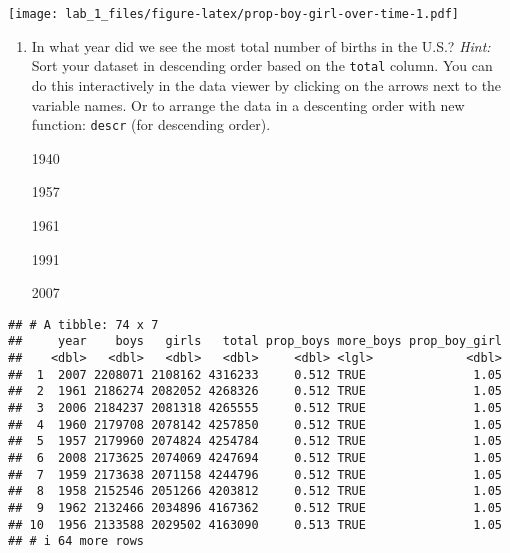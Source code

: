 \documentclass[
]{article}
\newenvironment{Shaded}{\begin{snugshade}}{\end{snugshade}}
\newcommand{\AttributeTok}[1]{\textcolor[rgb]{0.13,0.29,0.53}{#1}}
\newcommand{\CommentTok}[1]{\textcolor[rgb]{0.56,0.35,0.01}{\textit{#1}}}
\newcommand{\FunctionTok}[1]{\textcolor[rgb]{0.13,0.29,0.53}{\textbf{#1}}}
\newcommand{\NormalTok}[1]{#1}
\newcommand{\SpecialCharTok}[1]{\textcolor[rgb]{0.81,0.36,0.00}{\textbf{#1}}}
\providecommand{\tightlist}{%
  \setlength{\itemsep}{0pt}\setlength{\parskip}{0pt}}
\begin{document}
\texttt{[image: lab\_1\_files/figure-latex/prop-boy-girl-over-time-1.pdf]}

\begin{enumerate}
\def\labelenumi{\arabic{enumi}.}
\setcounter{enumi}{7}
\tightlist
\item
  In what year did we see the most total number of births in the U.S.?
  \emph{Hint:} Sort your dataset in descending order based on the
  \texttt{total} column. You can do this interactively in the data
  viewer by clicking on the arrows next to the variable names. Or to
  arrange the data in a descenting order with new function:
  \texttt{descr} (for descending order).

  1940

  1957

  1961

  1991

  2007
\end{enumerate}

\begin{Shaded}
\end{Shaded}

\begin{verbatim}
## # A tibble: 74 x 7
##     year    boys   girls   total prop_boys more_boys prop_boy_girl
##    <dbl>   <dbl>   <dbl>   <dbl>     <dbl> <lgl>             <dbl>
##  1  2007 2208071 2108162 4316233     0.512 TRUE               1.05
##  2  1961 2186274 2082052 4268326     0.512 TRUE               1.05
##  3  2006 2184237 2081318 4265555     0.512 TRUE               1.05
##  4  1960 2179708 2078142 4257850     0.512 TRUE               1.05
##  5  1957 2179960 2074824 4254784     0.512 TRUE               1.05
##  6  2008 2173625 2074069 4247694     0.512 TRUE               1.05
##  7  1959 2173638 2071158 4244796     0.512 TRUE               1.05
##  8  1958 2152546 2051266 4203812     0.512 TRUE               1.05
##  9  1962 2132466 2034896 4167362     0.512 TRUE               1.05
## 10  1956 2133588 2029502 4163090     0.513 TRUE               1.05
## # i 64 more rows
\end{verbatim}
\end{document}
